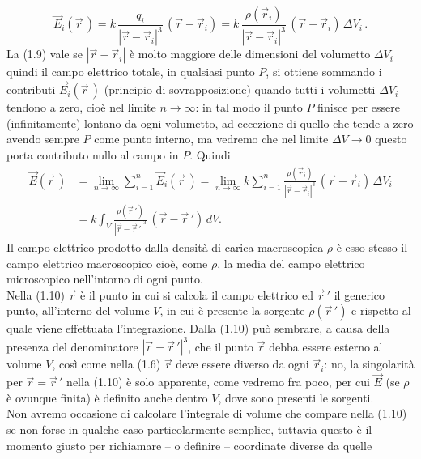 \begin{equation}
  \vec E_i(\vec r\,)=k\,\frac{q_i}{|\vec r-\vec r_i|^3}\,(\vec r-\vec r_i)
  =k\,\frac{\rho(\vec r_i)}{|\vec r-\vec r_i|^3}
  \,(\vec r-\vec r_i)\,\Delta V_i\,.
  \tag{1.9}
\end{equation}
La (1.9) vale se $|\vec r-\vec r_i|$ \`e molto maggiore delle dimensioni del
volumetto $\Delta V_i$ quindi il campo elettrico totale, in qualsiasi punto $P$,
si ottiene sommando i contributi $\vec E_i(\vec r\,)$
(principio di sovrapposizione) quando tutti i volumetti $\Delta V_i$ tendono a
zero, cio\`e nel limite $n\to\infty$: in tal modo il punto $P$ finisce per
essere (infinitamente) lontano da ogni volumetto, ad eccezione di quello che
tende a zero avendo sempre $P$ come punto interno, ma vedremo che nel limite
$\Delta V\to0$ questo porta contributo nullo al campo in $P$. Quindi
\begin{equation}
  \begin{split}
    \vec E(\vec r\,)&=\lim_{n\to\infty}\sum_{i=1}^n\vec E_i(\vec r\,)
    =\lim_{n\to\infty}k\sum_{i=1}^n
    \frac{\rho(\vec r_i)}{|\vec r-\vec r_i|^3}\,(\vec r-\vec r_i)\,\Delta V_i\\
    &=k\int_V\frac{\rho(\vec r\,')}{|\vec r-\vec r\,'|^3}
    \,(\vec r-\vec r\,')\,dV.
  \end{split}
  \tag{1.10}
\end{equation}
Il campo elettrico prodotto dalla densit\`a di carica macroscopica $\rho$ \`e
esso stesso il campo elettrico macroscopico cio\`e, come $\rho$, la media del
campo elettrico microscopico nell'intorno di ogni punto.\\
Nella (1.10) $\vec r$ \`e il punto in cui si calcola il campo elettrico ed
$\vec r\,'$ il generico punto, all'interno del volume $V$, in cui \`e presente
la sorgente $\rho(\vec r\,')$ e rispetto al quale viene effettuata
l'integrazione. Dalla (1.10) pu\`o sembrare, a causa della presenza del
denominatore $|\vec r-\vec r\,'|^3$, che il punto $\vec r$ debba essere esterno
al volume $V$, cos\`i come nella (1.6) $\vec r$ deve essere diverso da ogni
$\vec r_i$: no, la singolarit\`a per $\vec r=\vec r\,'$ nella (1.10) \`e solo
apparente, come vedremo fra poco, per cui $\vec E$ (se $\rho$ \`e ovunque
finita) \`e definito anche dentro $V$, dove sono presenti le sorgenti.\\
Non avremo occasione di calcolare l'integrale di volume che compare nella (1.10)
se non forse in qualche caso particolarmente semplice, tuttavia questo \`e il
momento giusto per richiamare -- o definire -- coordinate diverse da quelle
